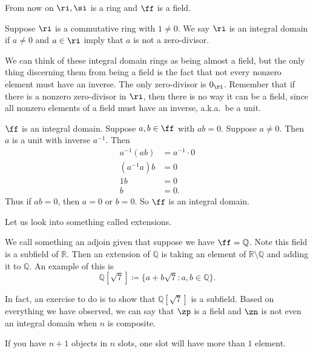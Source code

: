     {\Huge{From now on $\ri,\si$ is a ring and $\ff$ is a field.}}\\

\begin{definition}
    Suppose $\ri$ is a commutative ring with $1\neq 0$.
    We say $\ri$ is an integral domain if $a\neq 0$ and $a\in\ri$ imply that $a$ is not a zero-divisor.
\end{definition}

We can think of these integral domain rings as being almost a field, but the only thing discerning them from being a field is the fact that not every nonzero element must have an inverse.
The only zero-divisor is $0_\ri$.
Remember that if there is a nonzero zero-divisor in $\ri$, then there is no way it can be a field, since all nonzero elements of a field must have an inverse, a.k.a.\ be a unit.

\begin{corollary}{
    $\ff$ is an integral domain.
}
    Suppose $a,b\in\ff$ with $ab=0$.
    Suppose $a\neq 0$.
    Then $a$ is a unit with inverse $a^{-1}$.
    Then
    \begin{align*}
        a^{-1}(ab) &= a^{-1}\cdot 0\\
        (a^{-1}a)b &= 0\\
        1b &= 0\\
        b &= 0.
    \end{align*}
    Thus if $ab=0$, then $a=0$ or $b=0$.
    So $\ff$ is an integral domain.
\end{corollary}

Let us look into something called extensions.

\begin{definition}
    We call something an adjoin given that suppose we have $\ff=\mathbb{Q}$.
    Note this field is a subfield of $\mathbb{R}$.
    Then an extension of $\mathbb{Q}$ is taking an element of $\mathbb{R}\setminus\mathbb{Q}$ and adding it to $\mathbb{Q}$.
    An example of this is
    \[
        \mathbb{Q}\left[\sqrt{7}\right] \coloneqq \{a+b\sqrt{7}:a,b\in\mathbb{Q}\}.
    \]
\end{definition}

In fact, an exercise to do is to show that $\mathbb{Q}\left[\sqrt{7}\right]$ is a subfield.
Based on everything we have observed, we can say that $\zp$ is a field and $\zn$ is not even an integral domain when $n$ is composite.

\begin{axiom}
    If you have $n+1$ objects in $n$ slots, one slot will have more than $1$ element.
\end{axiom}

